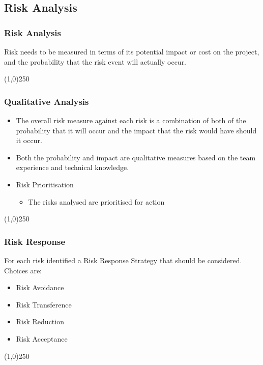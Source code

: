 \subsection{Risk Analysis}


\begin{frame}
\frametitle{Risk Analysis}
Risk needs to be measured in terms of its potential impact or cost on the project, and the probability that the risk event will actually occur.  
\end{frame}\begin{center}\line(1,0){250}\end{center}




\begin{frame}
\frametitle{Qualitative Analysis}
\begin{itemize}
\item The overall risk measure against each risk is a combination of both of the probability that it will occur and the impact that the risk would have should it occur.  
\item Both the probability and impact are qualitative measures based on the team experience and technical knowledge. 
\item Risk Prioritisation
\begin{itemize}
	\item The risks analysed are prioritised for action
\end{itemize}
\end{itemize}
\end{frame}\begin{center}\line(1,0){250}\end{center}






\begin{frame}
\frametitle{Risk Response}
For each risk identified a Risk Response Strategy that should be considered. Choices are:
\begin{itemize}
	\item Risk Avoidance
	\item Risk Transference
	\item Risk Reduction
	\item Risk Acceptance
\end{itemize}
\end{frame}\begin{center}\line(1,0){250}\end{center}






